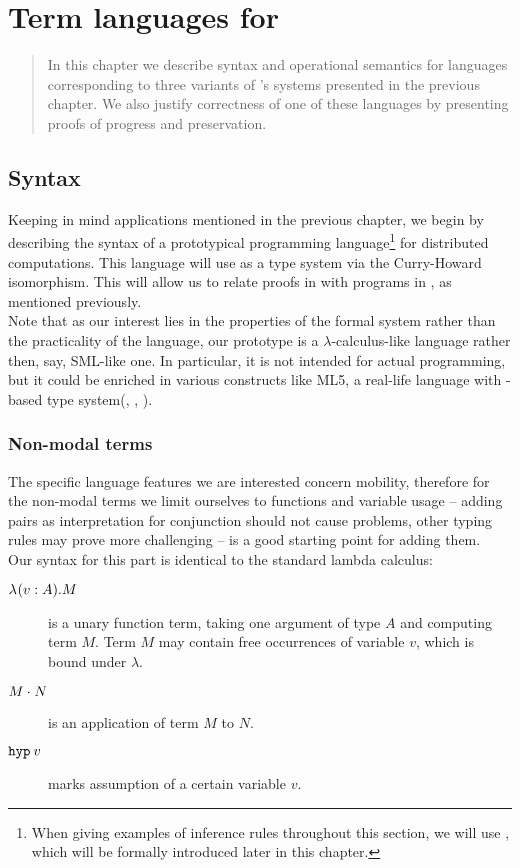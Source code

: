 \chapter{Term languages for \logic{}} \label{chapter:lang}

\begin{quote}
\small
In this chapter we describe syntax and operational semantics for languages corresponding to three variants of \logic{}'s \ND{} systems presented in the previous chapter. We also justify correctness of one of these languages by presenting proofs of progress and preservation.
\end{quote}

\section{Syntax}
Keeping in mind applications mentioned in the previous chapter, we begin by describing the syntax of a prototypical programming language\footnote{When giving examples of inference rules throughout this section, we will use \langL{}, which will be formally introduced later in this chapter.} for distributed computations. This language will use \logic{} as a type system via the Curry-Howard isomorphism. This will allow us to relate proofs in \logic{} with programs in \lang{}, as mentioned previously.\\

Note that as our interest lies in the properties of the formal system rather than the practicality of the language, our prototype is a $\lambda$-calculus-like language rather then, say, SML-like one. In particular, it is not intended for actual programming, but it could be enriched in various constructs like ML5, a real-life language with \logic{}-based type system(\cite{labeled}, \cite{labeledphd}, \cite{ml5}).\\

\subsection{Non-modal terms}
The specific language features we are interested concern mobility, therefore for the non-modal terms we limit ourselves to functions and variable usage -- adding pairs as interpretation for conjunction should not cause problems, other typing rules may prove more challenging -- \cite{labelfree} is a good starting point for adding them.\\

Our syntax for this part is identical to the standard lambda calculus:
\begin{description}
\item [$\mbox{$\lambda_{} (v: A). M$}$] is a unary function term, taking one argument of type $A$ and computing term $M$. Term $M$ may contain free occurrences of variable $v$, which is bound under $\lambda$.
\item [$\mbox{$M \cdot_{} N$}$] is an application of term $M$ to $N$.
\item [$\mbox{$\operatorname{\texttt{hyp}}_{} {v}$}$] marks assumption of a certain variable $v$.
\end{description}

